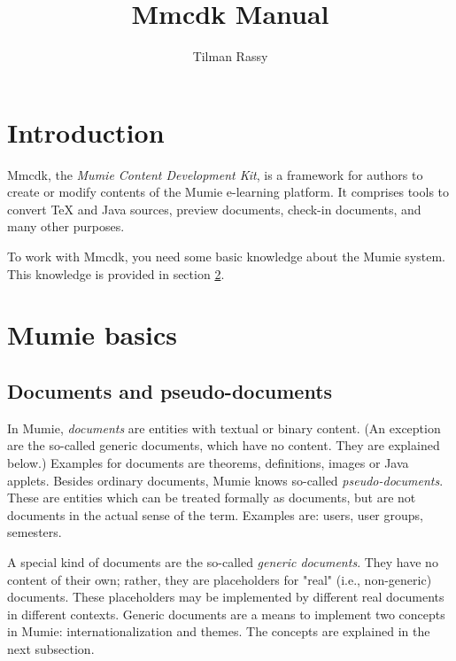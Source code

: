 \documentclass{generic}
\begin{document}
\title{Mmcdk Manual}

\begin{authors}
  \author[rassy@math.tu-berlin.de]{Tilman Rassy}
\end{authors}


\tableofcontents

\section{Introduction}

Mmcdk, the \emph{Mumie Content Development Kit}, is a
framework for authors to create or modify contents of the Mumie e-learning
platform. It comprises tools to convert TeX and Java sources, preview
documents, check-in documents, and many other purposes.

To work with Mmcdk, you need some basic knowledge about the Mumie system. This
knowledge is provided in section \ref{mumie_basics}.

\section{Mumie basics}\label{mumie_basics}

\subsection{Documents and pseudo-documents}\label{docs_and_pseudo_docs}

In Mumie, \emph{documents} are entities with textual or binary content. (An
exception are the so-called generic documents, which have no content. They are
explained below.) Examples for documents are theorems, definitions, images or
Java applets. Besides ordinary documents, Mumie knows so-called
\emph{pseudo-documents}. These are entities which can be treated formally as
documents, but are not documents in the actual sense of the term. Examples are:
users, user groups, semesters.

A special kind of documents are the so-called \emph{generic documents}. They
have no content of their own; rather, they are placeholders for "real" (i.e.,
non-generic) documents. These placeholders may be implemented by different real
documents in different contexts. Generic documents are a means to implement two
concepts in Mumie: internationalization and themes. The concepts are explained
in the next subsection.
\end{document}

